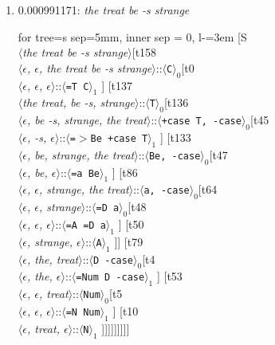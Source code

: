 \documentclass[11pt]{article}
\begin{document}
\begin{enumerate}
	\item  0.000991171: \textit{the treat be -s strange} \\[0.5em]
	\begin{forest}
	for tree={s sep=5mm, inner sep = 0, l-=3em}
	[S\\$\langle$\textit{the treat be -s strange}$\rangle$[t158\\$\langle$\textit{$\epsilon${,} $\epsilon${,} the treat be -s strange}$\rangle$::$\langle$\texttt{C}$\rangle_0$[t0\\$\langle$\textit{$\epsilon${,} $\epsilon${,} $\epsilon$}$\rangle$::$\langle$\texttt{{=}T C}$\rangle_1$ ] [t137\\$\langle$\textit{the treat{,} be -s{,} strange}$\rangle$::$\langle$\texttt{T}$\rangle_0$[t136\\$\langle$\textit{$\epsilon${,} be -s{,} strange{,} the treat}$\rangle$::$\langle$\texttt{+case T{,} -case}$\rangle_0$[t45\\$\langle$\textit{$\epsilon${,} -s{,} $\epsilon$}$\rangle$::$\langle$\texttt{{=}$>$Be +case T}$\rangle_1$ ] [t133\\$\langle$\textit{$\epsilon${,} be{,} strange{,} the treat}$\rangle$::$\langle$\texttt{Be{,} -case}$\rangle_0$[t47\\$\langle$\textit{$\epsilon${,} be{,} $\epsilon$}$\rangle$::$\langle$\texttt{{=}a Be}$\rangle_1$ ] [t86\\$\langle$\textit{$\epsilon${,} $\epsilon${,} strange{,} the treat}$\rangle$::$\langle$\texttt{a{,} -case}$\rangle_0$[t64\\$\langle$\textit{$\epsilon${,} $\epsilon${,} strange}$\rangle$::$\langle$\texttt{{=}D a}$\rangle_0$[t48\\$\langle$\textit{$\epsilon${,} $\epsilon${,} $\epsilon$}$\rangle$::$\langle$\texttt{{=}A {=}D a}$\rangle_1$ ] [t50\\$\langle$\textit{$\epsilon${,} strange{,} $\epsilon$}$\rangle$::$\langle$\texttt{A}$\rangle_1$ ]] [t79\\$\langle$\textit{$\epsilon${,} the{,} treat}$\rangle$::$\langle$\texttt{D -case}$\rangle_0$[t4\\$\langle$\textit{$\epsilon${,} the{,} $\epsilon$}$\rangle$::$\langle$\texttt{{=}Num D -case}$\rangle_1$ ] [t53\\$\langle$\textit{$\epsilon${,} $\epsilon${,} treat}$\rangle$::$\langle$\texttt{Num}$\rangle_0$[t5\\$\langle$\textit{$\epsilon${,} $\epsilon${,} $\epsilon$}$\rangle$::$\langle$\texttt{{=}N Num}$\rangle_1$ ] [t10\\$\langle$\textit{$\epsilon${,} treat{,} $\epsilon$}$\rangle$::$\langle$\texttt{N}$\rangle_1$ ]]]]]]]]]
	\end{forest}
	\newpage

\end{enumerate}
\end{document}
